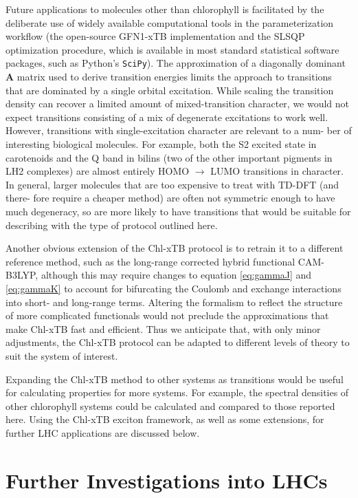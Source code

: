 Future applications to molecules other than chlorophyll is facilitated by the deliberate
use of widely available computational tools in the parameterization workflow (the 
open-source GFN1-xTB implementation and the SLSQP optimization procedure, which 
is available in most standard statistical software packages, such as Python's \texttt{SciPy}). 
The approximation of a diagonally dominant $\textbf{A}$ matrix used to derive transition
energies limits the approach to transitions that are dominated by a single orbital 
excitation. While scaling the transition density can recover a limited amount of 
mixed-transition character, we would not expect transitions consisting of a mix
of degenerate excitations to work well. However, transitions with single-excitation
character are relevant to a num- ber of interesting biological molecules. For example, 
both the S2 excited state in carotenoids and the Q band in bilins (two of the other
important pigments in LH2 complexes) are almost entirely HOMO $\rightarrow$ LUMO transitions 
in character\cite{Tracy2022, Matute2010, Scholes2013, Coccia2014}. In general, larger
molecules that are too expensive to treat with TD-DFT (and there- fore require a 
cheaper method) are often not symmetric enough to have much degeneracy, so are more 
likely to have transitions that would be suitable for describing with the type of 
protocol outlined here.

Another obvious extension of the Chl-xTB protocol is to retrain it to a different 
reference method, such as the long-range corrected hybrid functional CAM-B3LYP, 
although this may require changes to equation \ref{eq:gammaJ} and \ref{eq:gammaK} 
to account for bifurcating the Coulomb and exchange interactions into short- and
long-range terms. Altering the formalism to reflect the structure of more complicated 
functionals would not preclude the approximations that make Chl-xTB fast and efficient. 
Thus we anticipate that, with only minor adjustments, the Chl-xTB protocol can be 
adapted to different levels of theory to suit the system of interest.

Expanding the Chl-xTB method to other systems as transitions would be useful for
calculating properties for more systems. For example, the spectral densities of 
other chlorophyll systems could be calculated and compared to those reported here.
Using the Chl-xTB exciton framework, as well as some extensions, for further LHC
applications are discussed below.

\section{Further Investigations into LHCs}
\label{sec:lhc_investigations}

